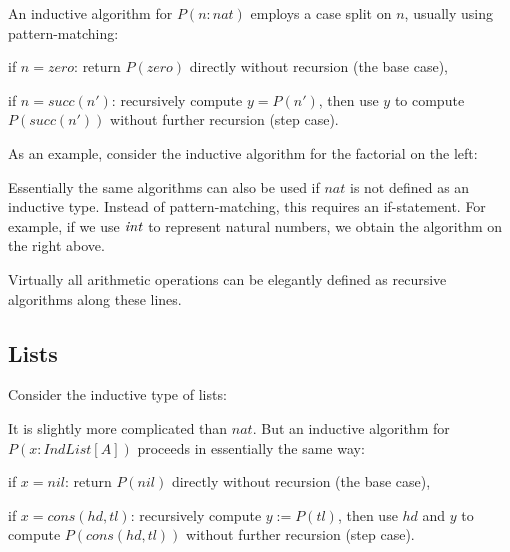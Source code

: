 An inductive algorithm for $P(n:nat)$ employs a case split on $n$, usually using pattern-matching:
\begin{compactitem}
 \item if $n=zero$: return $P(zero)$ directly without recursion (the base case),
 \item if $n=succ(n')$: recursively compute $y=P(n')$, then use $y$ to compute $P(succ(n'))$ without further recursion (step case).
\end{compactitem}

As an example, consider the inductive algorithm for the factorial on the left:
\newpage
\begin{multicols}{2}
\begin{acode}
\end{acode}
\columnbreak
\begin{acode}
\end{acode}
\end{multicols}

Essentially the same algorithms can also be used if $nat$ is not defined as an inductive type.
Instead of pattern-matching, this requires an if-statement.
For example, if we use $\mathit{int}$ to represent natural numbers, we obtain the algorithm on the right above.
\medskip

Virtually all arithmetic operations can be elegantly defined as recursive algorithms along these lines.

\subsection{Lists}

Consider the inductive type of lists:
\begin{acode}
\end{acode}

It is slightly more complicated than $nat$.
But an inductive algorithm for $P(x:IndList[A])$ proceeds in essentially the same way:
\begin{compactitem}
 \item if $x=nil$: return $P(nil)$ directly without recursion (the base case),
 \item if $x=cons(hd,tl)$: recursively compute $y:=P(tl)$, then use $hd$ and $y$ to compute $P(cons(hd,tl))$ without further recursion (step case).
\end{compactitem}

